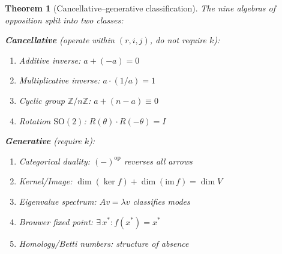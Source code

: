 \documentclass[11pt,a4paper]{article}
\newtheorem{theorem}{Theorem}
\newcommand{\rey}[1]{{\color{rcolor}#1}}
\newcommand{\imag}[1]{{\color{icolor}#1}}
\newcommand{\exac}[1]{{\color{jcolor}#1}}
\newcommand{\recu}[1]{{\color{kcolor}#1}}
\def\rey#1{#1}%
\def\imag#1{#1}%
\def\exac#1{#1}%
\def\recu#1{#1}%
\begin{document}
\begin{theorem}[Cancellative--generative classification]
\label{thm:split}
The nine algebras of opposition split into two classes:

\smallskip
\noindent\textbf{Cancellative} (operate within $(\rey{r}, \imag{i}, \exac{j})$, do not require $\recu{k}$):
\begin{enumerate}[nosep]
  \item Additive inverse: $a + (-a) = 0$
  \item Multiplicative inverse: $a \cdot (1/a) = 1$
  \item Cyclic group $\mathbb{Z}/n\mathbb{Z}$: $a + (n-a) \equiv 0$
  \item Rotation $\mathrm{SO}(2)$: $R(\theta) \cdot R(-\theta) = I$
\end{enumerate}

\smallskip
\noindent\textbf{Generative} (require $\recu{k}$):
\begin{enumerate}[nosep, start=5]
  \item Categorical duality: $(-)^{\mathrm{op}}$ reverses all arrows
  \item Kernel/Image: $\dim(\ker f) + \dim(\mathrm{im}\, f) = \dim V$
  \item Eigenvalue spectrum: $Av = \lambda v$ classifies modes
  \item Brouwer fixed point: $\exists\, x^*: f(x^*) = x^*$
  \item Homology/Betti numbers: structure of absence
\end{enumerate}
\end{theorem}
\end{document}

